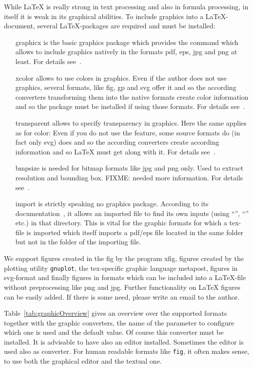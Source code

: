 \documentclass[12pt]{book}
\newcommand{\gls}[1]{#1}
\begin{document}
While \LaTeX{} is really strong in text processing 
and also in formula processing, 
in itself it is weak in its graphical abilities. 
To include graphics into a \LaTeX-document, 
several \LaTeX-packages are required and must be installed: 
%
\begin{itemize}
\item[graphicx]
is the basic graphics package which provides the command 
which allows to include graphics natively 
in the formats pdf, eps, jpg and png at least. 
For details see~\cite{GraX}. 
\item[xcolor]
allows to use colors in graphics. 
Even if the author does not use graphics, 
several formats, like \gls{fig}, \gls{gp} and \gls{svg} 
offer it and so the according converters 
transforming them into the native formats 
create color information and so the package must be installed 
if using those formats. 
For details see~\cite{XColorP}. 
\item[transparent]
allows to specify transparency in graphics. 
Here the same applies as for color: 
Even if you do not use the feature, 
some source formats do (in fact only \gls{svg}) does 
and so the according converters create according information 
and so \LaTeX{} must get along with it. 
For details see~\cite{TransP}. 
\item[bmpsize]
is needed for bitmap formats like \gls{jpg} and \gls{png} only. 
Used to extract resolution and bounding box. 
FIXME\@: needed more information. 
For details see~\cite{BmpP}. 
\item[import]
is strictly speaking no graphics package. 
According to its documentation~\cite{ImpoP}, 
it allows an imported file to find its own inputs 
(using ``'', ``'' etc.) in that directory. 
This is vital for the graphic formats for which a tex-file is imported 
which itself imports a pdf/eps file located in the same folder 
but not in the folder of the importing file. 
\end{itemize}

We support figures created in the \gls{fig} by the program xfig, 
figures created by the plotting utility \texttt{gnuplot}, 
the tex-specific graphic language metapost, 
figures in \gls{svg}-format 
and finally figures in formats which can be included into a \LaTeX-file 
without preprocessing like \gls{png} and \gls{jpg}. 
Further functionality on \LaTeX{} figures can be easily added. 
If there is some need, please write an email to the author. 

Table~\ref{tab:graphicOverview} gives an overview over the supported formats 
together with the graphic converters, 
the name of the parameter to configure which one is used 
and the default value. 
Of course this converter must be installed. 
It is advisable to have also an editor installed. 
Sometimes the editor is used also as converter. 
For human readable formats like \texttt{fig}, it often makes sense, 
to use both the graphical editor and the textual one. 
\end{document}
